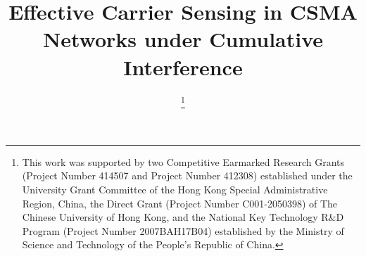 \documentclass[conference]{IEEEtran}
\begin{document}
\title{Effective Carrier Sensing in CSMA Networks under
Cumulative Interference}



\author{

\thanks{This work was supported by two
Competitive Earmarked Research Grants (Project Number 414507 and
Project Number 412308) established under the University Grant
Committee of the Hong Kong Special Administrative Region, China, the
Direct Grant (Project Number C001-2050398) of The Chinese University
of Hong Kong, and the National Key Technology R\&D Program (Project
Number 2007BAH17B04) established by the Ministry of Science and
Technology of the People's Republic of China. }

}



\maketitle
\end{document}
